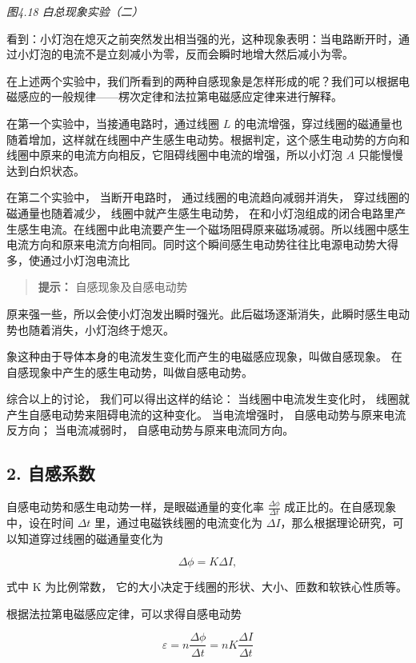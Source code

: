 \emph{图4.18 白总现象实验（二）}

看到：小灯泡在熄灭之前突然发出相当强的光，这种现象表明：当电路断开时，通过小灯泡的电流不是立刻减小为零，反而会瞬时地增大然后减小为零。

在上述两个实验中，我们所看到的两种自感现象是怎样形成的呢？我们可以根据电磁感应的一般规律------楞次定律和法拉第电磁感应定律来进行解释。

在第一个实验中，当接通电路时，通过线圈 \(L\)
的电流增强，穿过线圈的磁通量也随着增加，这样就在线圈中产生感生电动势。根据判定，这个感生电动势的方向和线圈中原来的电流方向相反，它阻碍线圈中电流的增强，所以小灯泡
\(A\) 只能慢慢达到白炽状态。

在第二个实验中， 当断开电路时， 通过线圈的电流趋向减弱并消失，
穿过线圈的磁通量也随着减少， 线圈中就产生感生电动势，
在和小灯泡组成的闭合电路里产生感生电流。在线圈中此电流要产生一个磁场阻碍原来磁场减弱。所以线圈中感生电流方向和原来电流方向相同。同时这个瞬间感生电动势往往比电源电动势大得多，使通过小灯泡电流比

\begin{quote}
\textbf{提示：} 自感现象及自感电动势
\end{quote}

原来强一些，所以会使小灯泡发出瞬时强光。此后磁场逐渐消失，此瞬时感生电动势也随着消失，小灯泡终于熄灭。

象这种由于导体本身的电流发生变化而产生的电磁感应现象，叫做自感现象。
在自感现象中产生的感生电动势，叫做自感电动势。

综合以上的讨论， 我们可以得出这样的结论： 当线圈中电流发生变化时，
线圈就产生自感电动势来阻碍电流的这种变化。 当电流增强时，
自感电动势与原来电流反方向； 当电流减弱时， 自感电动势与原来电流同方向。

\subsection{2. 自感系数}\label{ux81eaux611fux7cfbux6570}

自感电动势和感生电动势一样，是眼磁通量的变化率
\(\frac{\Delta\phi}{\Delta t}\) 成正比的。在自感现象中，设在时间
\(\Delta t\) 里，通过电磁铁线圈的电流变化为
\(\Delta I\)，那么根据理论研究，可以知道穿过线圈的磁通量变化为

\[
\Delta \phi = K \Delta I,
\]

式中 K 为比例常数， 它的大小决定于线圈的形状、大小、匝数和软铁心性质等。

根据法拉第电磁感应定律，可以求得自感电动势

\[
\varepsilon = n \frac{\Delta \phi}{\Delta t} = n K \frac{\Delta I}{\Delta t}
\]

